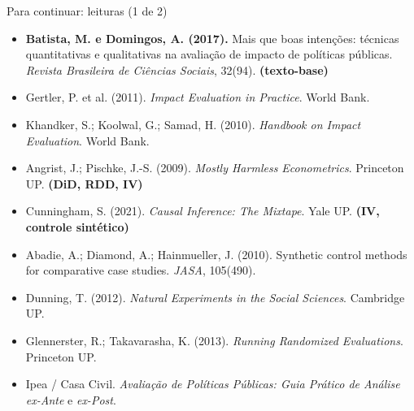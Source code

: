 \begin{frame}{Para continuar: leituras (1 de 2)}
  \scriptsize\setlength{\itemsep}{0pt}
  \begin{itemize}
    \item \textbf{Batista, M. e Domingos, A. (2017).} Mais que boas intenções: técnicas quantitativas e qualitativas na avaliação de impacto de políticas públicas. \emph{Revista Brasileira de Ciências Sociais}, 32(94).  \textbf{(texto-base)}
    \item Gertler, P. et al. (2011). \emph{Impact Evaluation in Practice}. World Bank.
    \item Khandker, S.; Koolwal, G.; Samad, H. (2010). \emph{Handbook on Impact Evaluation}. World Bank.
    \item Angrist, J.; Pischke, J.-S. (2009). \emph{Mostly Harmless Econometrics}. Princeton UP. \textbf{(DiD, RDD, IV)}
    \item Cunningham, S. (2021). \emph{Causal Inference: The Mixtape}. Yale UP. \textbf{(IV, controle sintético)}
    \item Abadie, A.; Diamond, A.; Hainmueller, J. (2010). Synthetic control methods for comparative case studies. \emph{JASA}, 105(490).
    \item Dunning, T. (2012). \emph{Natural Experiments in the Social Sciences}. Cambridge UP.
    \item Glennerster, R.; Takavarasha, K. (2013). \emph{Running Randomized Evaluations}. Princeton UP.
    \item Ipea / Casa Civil. \emph{Avaliação de Políticas Públicas: Guia Prático de Análise ex-Ante} e \emph{ex-Post}.
  \end{itemize}
\end{frame}

